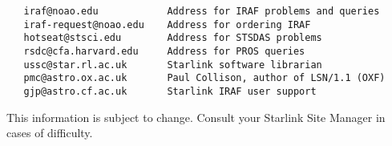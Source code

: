 \begin{verbatim}
   iraf@noao.edu            Address for IRAF problems and queries
   iraf-request@noao.edu    Address for ordering IRAF
   hotseat@stsci.edu        Address for STSDAS problems
   rsdc@cfa.harvard.edu     Address for PROS queries
   ussc@star.rl.ac.uk       Starlink software librarian
   pmc@astro.ox.ac.uk       Paul Collison, author of LSN/1.1 (OXF)
   gjp@astro.cf.ac.uk       Starlink IRAF user support
\end{verbatim}

This information is subject to change.  Consult your Starlink Site
Manager in cases of difficulty.



